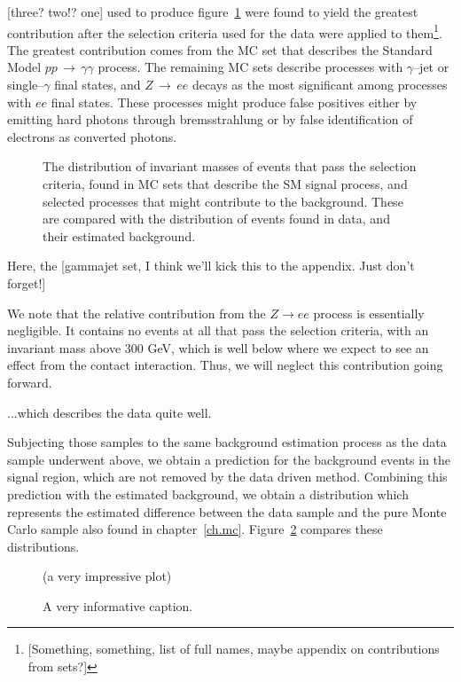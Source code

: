 [three? two!? one\textinterrobang\textinterrobang] used to produce figure~\ref{mclist} were found to yield the greatest contribution after the selection criteria used for the data were applied to them\footnote{[Something, something, list of full names, maybe appendix on contributions from sets?]}. The greatest contribution comes from the MC set that describes the Standard Model $pp\,\rightarrow\,\gamma\gamma$ process. The remaining MC sets describe processes with $\gamma$--jet or single--$\gamma$ final states, and  $Z\,\rightarrow\,ee$ decays as the most significant among processes with $ee$ final states. These processes might produce false positives either by emitting hard photons through bremsstrahlung or by false identification of electrons as converted photons.

\begin{figure}[htp]
\begin{minipage}[b]{.69\textwidth}
\begin{infilsf} \tiny

\end{infilsf}
\end{minipage}
\begin{minipage}[b]{.3\textwidth}
\caption{The distribution of invariant masses of events that pass the selection criteria, found in \atlas{} MC sets that describe the SM signal process, and selected processes that might contribute to the background. These are compared with the distribution of events found in data, and their estimated background.}\label{mclist}
\end{minipage}
\end{figure}

Here, the [gammajet set, I think we'll kick this to the appendix. Just don't forget!]

We note that the relative contribution from the $Z\rightarrow ee$ process is essentially negligible. It contains no events at all that pass the selection criteria, with an invariant mass above 300 GeV, which is well below where we expect to see an effect from the contact interaction. Thus, we will neglect this contribution going forward.



...which describes the data quite well.

Subjecting those samples to the same background estimation process as the data sample underwent above, we obtain a prediction for the background events in the signal region, which are not removed by the data driven method. Combining this prediction with the estimated background, we obtain a distribution which represents the estimated difference between the data sample and the pure Monte Carlo sample also found in chapter~\ref{ch.mc}. Figure~\ref{tobck} compares these distributions.

\begin{figure}[htp]
\begin{minipage}[b]{.69\textwidth}
\centering (a very impressive plot)
\end{minipage}\hfill\begin{minipage}[b]{.3\textwidth}
\caption{A very informative caption.
\label{tobck}}
\end{minipage}
\end{figure}




